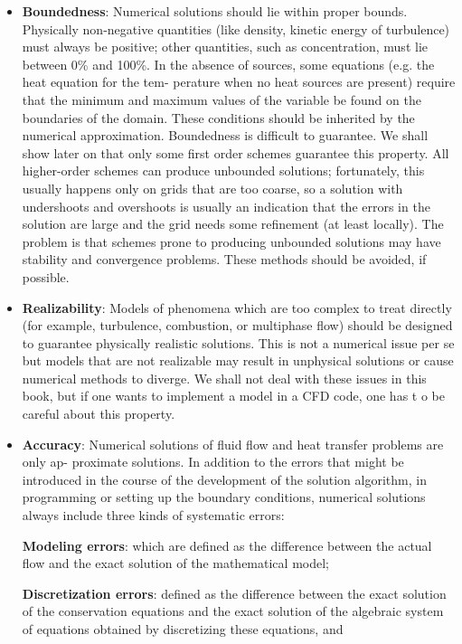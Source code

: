 \begin{itemize}
 \item \textbf{Boundedness}: Numerical solutions should lie within proper bounds. Physically non-negative
quantities (like density, kinetic energy of turbulence) must always be positive;
other quantities, such as concentration, must lie between 0\% and 100\%. In
the absence of sources, some equations (e.g. the heat equation for the tem-
perature when no heat sources are present) require that the minimum and
maximum values of the variable be found on the boundaries of the domain.
These conditions should be inherited by the numerical approximation.
Boundedness is difficult to guarantee. We shall show later on that only
some first order schemes guarantee this property. All higher-order schemes
can produce unbounded solutions; fortunately, this usually happens only on
grids that are too coarse, so a solution with undershoots and overshoots
is usually an indication that the errors in the solution are large and the
grid needs some refinement (at least locally). The problem is that schemes
prone to producing unbounded solutions may have stability and convergence
problems. These methods should be avoided, if possible.

 \item \textbf{Realizability}: Models of phenomena which are too complex to treat directly (for example,
turbulence, combustion, or multiphase flow) should be designed to guarantee
physically realistic solutions. This is not a numerical issue per se but models
that are not realizable may result in unphysical solutions or cause numerical
methods to diverge. We shall not deal with these issues in this book, but if
one wants to implement a model in a CFD code, one has t o be careful about
this property.

 \item \textbf{Accuracy}: Numerical solutions of fluid flow and heat transfer problems are only ap-
proximate solutions. In addition to the errors that might be introduced in
the course of the development of the solution algorithm, in programming or
setting up the boundary conditions, numerical solutions always include three
kinds of systematic errors:

\textbf{Modeling errors}: which are defined as the difference between the actual
flow and the exact solution of the mathematical model;

\textbf{Discretization errors}: defined as the difference between the exact solution
of the conservation equations and the exact solution of the algebraic system
of equations obtained by discretizing these equations, and


\end{itemize}
